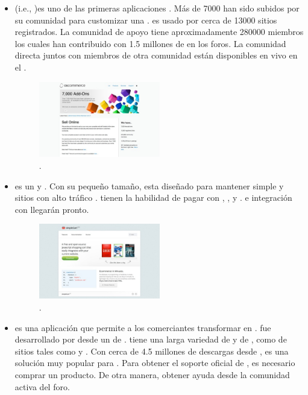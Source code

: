 \begin{itemize}
	\item \textbf{\nameOsCommerce} (i.e., \openSourcePC \commerce)es uno de las primeras aplicaciones \ecommerce \openSourcePC. Más de 7000 \free \addOns han sido subidos por su comunidad para customizar una \store \online. \nameOsCommerce es usado por cerca de 13000 sitios registrados. La comunidad de apoyo tiene aproximadamente 280000 miembros los cuales han contribuido con 1.5 millones de \posts en los foros. La comunidad directa juntos con miembros de otra comunidad están disponibles en vivo en el \chat \room.

	\begin{figure}[H]
		\centering
		\includegraphics[width=0.5\textwidth]{figuras/cap1/osCommerceWebsite.jpg}
		\caption{\nameOsCommerce \websiteINT \cite{online_osCommerce}.}
	\end{figure}

	\item \textbf{\nameSimpleCart} es un \free y \openSourcePC \javaScriptNAME \shoppingCart. Con su pequeño tamaño, \nameSimpleCart esta diseñado para mantener simple  y sitios con alto tráfico \running \fast. \nameSimpleCart tienen la habilidad de pagar con \paypalCheckout, \googleCheckout, y \amazonPayments. \email \checkoutCOM e integración con \AuthorizeNet llegarán pronto.
	
	\begin{figure}[H]
		\centering
		\includegraphics[width=0.5\textwidth]{figuras/cap1/simpleCartWebsite.jpg}
		\caption{\nameSimpleCart \websiteINT \cite{online_simpleCart}.}
	\end{figure}

	\item \textbf{\nameWooCommerce} es una aplicación \ecommerce \free \openSourcePC que permite a los comerciantes transformar \wordPress \sites en \stores. \nameWooCommerce fue desarrollado por \wooThemes desde un \fork de \nameJigoshop. \nameWooCommerce tiene una larga variedad de  \plugins y  \themes de \wooThemes, como de sitios \thirdParty tales como \themeForest \cite{online_ThemeForest} y \codeCanyon \cite{online_CodeCanyon}. Con cerca de 4.5 millones de descargas desde \wordPressOrg\cite{online_WordPress}, \nameWooCommerce es una solución \ecommerce muy popular para \wordPress. Para obtener el soporte oficial de \wooThemes, es necesario comprar un producto. De otra manera, obtener ayuda desde la comunidad activa del foro.


\end{itemize}

